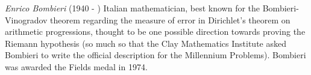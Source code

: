 \documentclass[12pt]{article}
\begin{document}
\emph{Enrico Bombieri} (1940 - ) Italian mathematician, best known for the Bombieri-Vinogradov theorem regarding the measure of error in Dirichlet's theorem on arithmetic progressions, thought to be one possible direction towards proving the Riemann hypothesis (so much so that the Clay Mathematics Institute asked Bombieri to write the official description for the Millennium Problems). Bombieri was awarded the Fields medal in 1974.
\end{document}
